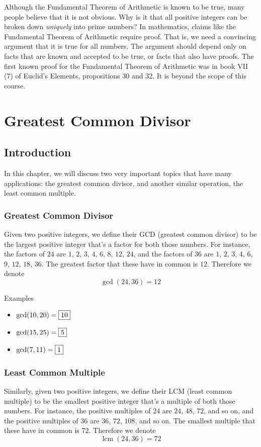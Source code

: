 \documentclass[a4paper,10pt]{report}
\begin{document}
Although the Fundamental Theorem of Arithmetic is known to be true, many people
believe that it is not obvious. Why is it that all positive integers can be
broken down \emph{uniquely} into prime numbers? In mathematics, claims like the
Fundamental Theorem of Arithmetic require proof. That is, we need a convincing
argument that it is true for all numbers. The argument should depend only on
facts that are known and accepted to be true, or facts that also have proofs.
The first known proof for the Fundamental Theorem of Arithmetic was in book VII
(7) of Euclid's Elements, propositions 30 and 32. It is beyond the scope of this
course.

\chapter{Greatest Common Divisor}

\section{Introduction}

In this chapter, we will discuss two very important
topics that have many applications: the greatest common divisor, and another
similar operation, the least common multiple.

\subsection{Greatest Common Divisor}

Given two positive integers, we define their GCD (greatest common divisor) to be
the largest positive integer that's a factor for both those numbers. For
instance, the factors of $24$ are $1$, $2$, $3$, $4$, $6$, $8$, $12$, $24$, and
the factors of $36$ are $1$, $2$, $3$, $4$, $6$, $9$, $12$, $18$, $36$. The
greatest factor that these have in common is $12$. Therefore we denote \[
 \gcd(24, 36) = 12
\]

\begin{problem}{Examples}
 \begin{itemize}
  \item $\gcd(10, 20) = \Ans{10}$
  \item $\gcd(15, 25) = \Ans{5}$
  \item $\gcd(7, 11) = \Ans{1}$
 \end{itemize}
\end{problem}

\subsection{Least Common Multiple}
Similarly, given two positive integers, we define their LCM (least common
multiple) to be the smallest positive integer that's a multiple of both those
numbers. For instance, the positive multiples of $24$ are $24$, $48$, $72$, and
so on, and the positive multiples of $36$ are $36$, $72$, $108$, and so on.
The smallest multiple that these have in common is $72$. Therefore we
denote \[
 \operatorname{lcm}(24, 36) = 72
\]
\end{document}
